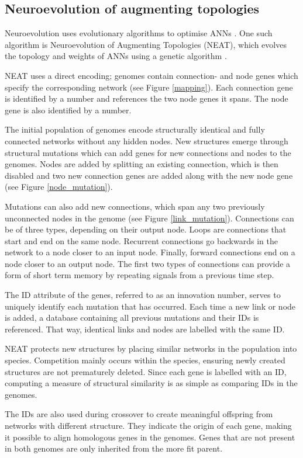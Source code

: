 \subsection{Neuroevolution of augmenting topologies}
Neuroevolution uses evolutionary algorithms to optimise ANNs \cite{neuroevolution_review}.
One such algorithm is Neuroevolution of Augmenting Topologies (NEAT), which evolves the topology and weights of ANNs
using a genetic algorithm \cite{neat_main, neat_short, neat_phd}.

NEAT uses a direct encoding; genomes contain connection- and node genes which specify the corresponding
network (see Figure \ref{mapping}). Each connection gene is identified by a number and
references the two node genes it spans. The node gene is also identified by a number.



The initial population of genomes encode structurally identical and fully connected networks without any hidden nodes.
New structures emerge through structural mutations which can add genes for new connections and nodes to the genomes.
Nodes are added by splitting an existing connection, which is then disabled and two new connection genes are added along
with the new node gene (see Figure \ref{node_mutation}).



Mutations can also add new connections, which span any two previously unconnected nodes in the genome (see Figure \ref{link_mutation}).
Connections can be of three types, depending on their output node. Loops are connections that start and end on the same node. Recurrent
connections go backwards in the network to a node closer to an input node. Finally, forward connections end on a node closer to an output
node. The first two types of connections can provide a form of short term memory by repeating signals from a previous time step.



The ID attribute of the genes, referred to as an innovation number, serves to uniquely identify each mutation that has occurred.
Each time a new link or node is added, a database containing all previous mutations and their IDs is referenced. That way,
identical links and nodes are labelled with the same ID.

NEAT protects new structures by placing similar networks in the population into species.
Competition mainly occurs within the species, ensuring newly created structures are not prematurely deleted.
Since each gene is labelled with an ID, computing a measure of structural similarity is as simple as
comparing IDs in the genomes.

The IDs are also used during crossover to create meaningful offspring from networks with different structure.
They indicate the origin of each gene, making it possible to align homologous genes in the genomes. Genes
that are not present in both genomes are only inherited from the more fit parent.


